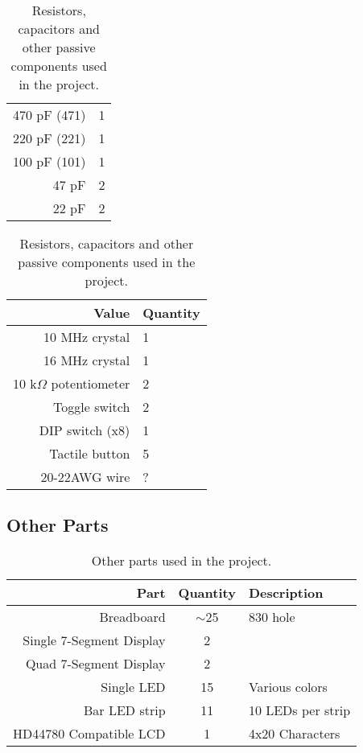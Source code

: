 \begin{table}[H]
\begin{subtable}[t]{0.3\textwidth}
\begin{tabular}{r|l}
      470 pF (471)             & 1 \\
      220 pF (221)             & 1 \\
      100 pF (101)             & 1 \\    
      47 pF                    & 2  \\    
      22 pF                    & 2  \\    
    \end{tabular}
    \caption{Capacitors}
  \end{subtable}
  \hfill
  \begin{subtable}[t]{0.3\textwidth}
    \vspace{0pt}
    \begin{tabular}{r|l}
      Value                      & Quantity \\ \hline
      10 MHz crystal             & 1 \\    
      16 MHz crystal             & 1 \\
      10 k$\Omega$ potentiometer & 2 \\
      Toggle switch              & 2 \\
      DIP switch (x8)            & 1 \\
      Tactile button             & 5 \\
      20-22AWG wire              & ? \\
    \end{tabular}
    \caption{Other passive components}
  \end{subtable}

  \caption{Resistors, capacitors and other passive components used in the project.}
  \label{tab:rcbom}
\end{table}


\subsection{Other Parts}
\begin{table}[H]
  \centering
  \begin{tabular}{r|c|l}
    Part                     & Quantity & Description \\\hline
    Breadboard               & $\sim$25 & 830 hole  \\
    Single 7-Segment Display & 2 &    \\
    Quad 7-Segment Display   & 2 &    \\
    Single LED               & 15& Various colors \\
    Bar LED strip            & 11& 10 LEDs per strip  \\
    HD44780 Compatible LCD   & 1 & 4x20 Characters  \\
  \end{tabular}
  \caption{Other parts used in the project.}
  \label{tab:parts}
\end{table}

